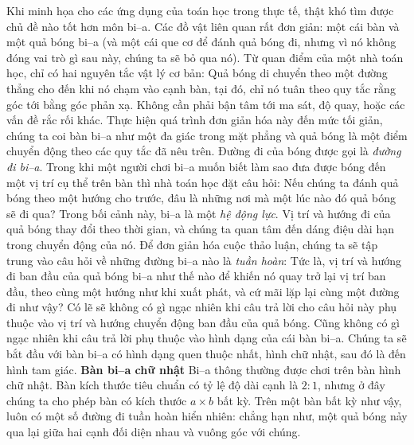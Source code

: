 \vspace*{180pt}

\begin{multicols}{2}	
	Khi minh họa cho các ứng dụng của toán học trong thực tế, thật khó tìm được chủ đề nào tốt hơn môn bi--a. Các đồ vật liên quan rất đơn giản: một cái bàn và một quả bóng \linebreak bi--a (và một cái que cơ để đánh quả bóng đi, nhưng vì nó không đóng vai trò gì sau này, chúng ta sẽ bỏ qua nó). 
	\vskip 0.1cm
	Từ quan điểm của một nhà toán học, chỉ có hai nguyên tắc vật lý cơ bản: Quả bóng di chuyển theo một đường thẳng cho đến khi nó chạm vào cạnh bàn, tại đó, chỉ nó tuân theo quy tắc rằng góc tới bằng góc phản xạ. Không cần phải bận tâm tới ma sát, độ quay, hoặc các vấn đề rắc rối khác.
	\vskip 0.1cm
	Thực hiện quá trình đơn giản hóa này đến mức tối giản, chúng ta coi bàn bi--a như một đa giác trong mặt phẳng và quả bóng là một điểm chuyển động theo các quy tắc đã nêu trên. Đường đi của bóng được gọi là \emph{đường đi bi--a}. 
	\vskip 0.1cm
	Trong khi một người chơi bi--a muốn biết làm sao đưa được bóng đến một vị trí cụ thể trên bàn thì nhà toán học đặt câu hỏi: Nếu chúng ta đánh quả bóng theo một hướng cho trước, đâu là những nơi mà một lúc nào đó quả bóng sẽ đi qua? Trong bối cảnh này, \linebreak bi--a là một \emph{hệ động lực}. Vị trí và hướng đi của quả bóng thay đổi theo thời gian, và chúng ta quan tâm đến dáng điệu dài hạn trong chuyển động của nó.
	\vskip 0.1cm
	Để đơn giản hóa cuộc thảo luận, chúng ta sẽ tập trung vào câu hỏi về những đường  bi--a nào là \emph{tuần hoàn}: Tức là, vị trí và hướng đi ban đầu của quả bóng bi--a như thế nào để khiến nó quay trở lại vị trí ban đầu, theo cùng một hướng như khi xuất phát, và cứ mãi lặp lại cùng một đường đi như vậy?
	\vskip 0.1cm
	Có lẽ sẽ không có gì ngạc nhiên khi câu trả lời cho câu hỏi này phụ thuộc vào vị trí và hướng chuyển động ban đầu của quả bóng. Cũng không có gì ngạc nhiên khi câu trả lời phụ thuộc vào hình dạng của cái bàn bi--a. Chúng ta sẽ bắt đầu với bàn bi--a có hình dạng quen thuộc nhất, hình chữ nhật, sau đó là đến hình tam giác.
	\vskip 0.1cm
	{\bf\color{duongvaotoanhoc}Bàn bi--a chữ nhật}
	\vskip 0.1cm
	Bi--a thông thường được chơi trên bàn hình chữ nhật. Bàn kích thước tiêu chuẩn có tỷ lệ độ dài cạnh là $2:1$, nhưng ở đây chúng ta cho phép bàn có kích thước $a\times b$ bất kỳ. Trên một bàn bất kỳ như vậy, luôn có một số đường đi tuần hoàn hiển nhiên:
	chẳng hạn như, một quả bóng nảy qua lại giữa hai cạnh đối diện nhau và vuông góc với chúng.
	\vskip 0.1cm

\end{multicols}
